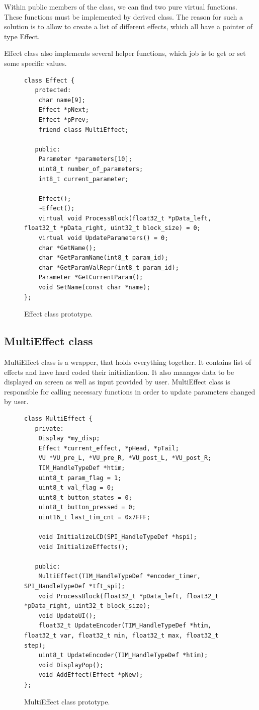 \documentclass[a4paper,twoside,12pt]{book}
\begin{document}
Within public members of the class,
we can find two pure virtual functions.
These functions must be implemented by derived class.
The reason for such a solution is to allow
to create a list of different effects, which all have a pointer
of type Effect.

Effect class also implements several helper functions,
which job is to get or set some specific values.

\begin{figure}[H]
\centering
\begin{lstlisting}
class Effect {
   protected:
    char name[9];
    Effect *pNext;
    Effect *pPrev;
    friend class MultiEffect;

   public:
    Parameter *parameters[10];
    uint8_t number_of_parameters;
    int8_t current_parameter;

    Effect();
    ~Effect();
    virtual void ProcessBlock(float32_t *pData_left, float32_t *pData_right, uint32_t block_size) = 0;
    virtual void UpdateParameters() = 0;
    char *GetName();
    char *GetParamName(int8_t param_id);
    char *GetParamValRepr(int8_t param_id);
    Parameter *GetCurrentParam();
    void SetName(const char *name);
};
\end{lstlisting}
\caption{Effect class prototype.}
\label{fig:Effect}
\end{figure}

\newpage

\subsection{MultiEffect class}
MultiEffect class is a wrapper, that holds everything together.
It contains list of effects and have hard coded their initialization.
It also manages data to be displayed on screen
as well as input provided by user.
MultiEffect class is responsible for calling necessary functions
in order to update parameters changed by user.

\begin{figure}[H]
\centering
\begin{lstlisting}
class MultiEffect {
   private:
    Display *my_disp;
    Effect *current_effect, *pHead, *pTail;
    VU *VU_pre_L, *VU_pre_R, *VU_post_L, *VU_post_R;
    TIM_HandleTypeDef *htim;
    uint8_t param_flag = 1;
    uint8_t val_flag = 0;
    uint8_t button_states = 0;
    uint8_t button_pressed = 0;
    uint16_t last_tim_cnt = 0x7FFF;

    void InitializeLCD(SPI_HandleTypeDef *hspi);
    void InitializeEffects();

   public:
    MultiEffect(TIM_HandleTypeDef *encoder_timer, SPI_HandleTypeDef *tft_spi);
    void ProcessBlock(float32_t *pData_left, float32_t *pData_right, uint32_t block_size);
    void UpdateUI();
    float32_t UpdateEncoder(TIM_HandleTypeDef *htim, float32_t var, float32_t min, float32_t max, float32_t step);
    uint8_t UpdateEncoder(TIM_HandleTypeDef *htim);
    void DisplayPop();
    void AddEffect(Effect *pNew);
};
\end{lstlisting}
\caption{MultiEffect class prototype.}
\label{fig:Multi}
\end{figure}
\end{document}
